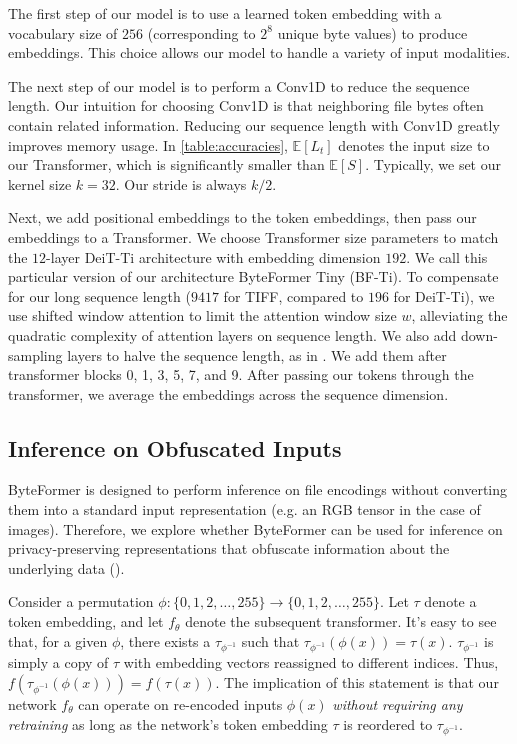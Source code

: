 The first step of our model is to use a learned token embedding with a vocabulary size of $256$ (corresponding to $2^8$ unique byte values) to produce embeddings. This choice allows our model to handle a variety of input modalities.

The next step of our model is to perform a Conv1D to reduce the sequence length. Our intuition for choosing Conv1D is that neighboring file bytes often contain related information. Reducing our sequence length with Conv1D greatly improves memory usage. In \autoref{table:accuracies}, $\mathbb{E}[L_t]$ denotes the input size to our Transformer, which is significantly smaller than $\mathbb{E}[S]$. Typically, we set our kernel size $k=32$. Our stride is always $k/2$.

Next, we add positional embeddings to the token embeddings, then pass our embeddings to a Transformer. We choose Transformer size parameters to match the $12$-layer DeiT-Ti \cite{deit} architecture with embedding dimension $192$. We call this particular version of our architecture ByteFormer Tiny (BF-Ti). To compensate for our long sequence length ($9417$ for TIFF, compared to $196$ for DeiT-Ti), we use shifted window attention \cite{swintransformer} to limit the attention window size $w$, alleviating the quadratic complexity of attention layers on sequence length. We also add down-sampling layers to halve the sequence length, as in \cite{swintransformer}. We add them after transformer blocks 0, 1, 3, 5, 7, and 9. After passing our tokens through the transformer, we average the embeddings across the sequence dimension.

\subsection{Inference on Obfuscated Inputs} \label{sec:methods-obfuscation}
ByteFormer is designed to perform inference on file encodings without converting them into a standard input representation (e.g. an RGB tensor in the case of images). Therefore, we explore whether ByteFormer can be used for inference on privacy-preserving representations that obfuscate information about the underlying data ().

Consider a permutation $\phi: \{0, 1, 2, \ldots, 255\} \to \{0, 1, 2, \ldots, 255\}$. Let $\tau$ denote a token embedding, and let $f_\theta$ denote the subsequent transformer. It's easy to see that, for a given $\phi$, there exists a $\tau_{\phi^{-1}}$ such that $\tau_{\phi^{-1}}(\phi(x)) = \tau(x)$. $\tau_{\phi^{-1}}$ is simply a copy of $\tau$ with embedding vectors reassigned to different indices. Thus, $f(\tau_{\phi^{-1}}(\phi(x))) = f(\tau(x))$. The implication of this statement is that our network $f_\theta$ can operate on re-encoded inputs $\phi(x)$ \textit{without requiring any retraining} as long as the network's token embedding $\tau$ is reordered to $\tau_{\phi^{-1}}$.

